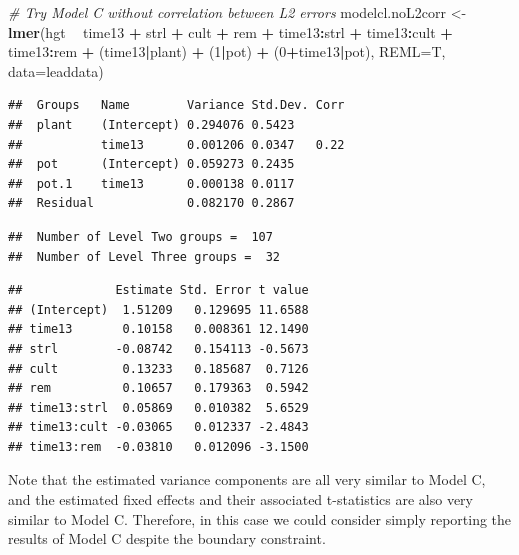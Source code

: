 \documentclass[
]{krantz}
\newenvironment{Shaded}{\begin{snugshade}}{\end{snugshade}}
\newcommand{\CommentTok}[1]{\textcolor[rgb]{0.37,0.37,0.37}{\textit{#1}}}
\newcommand{\DataTypeTok}[1]{\textcolor[rgb]{0.27,0.27,0.27}{#1}}
\newcommand{\DecValTok}[1]{\textcolor[rgb]{0.06,0.06,0.06}{#1}}
\newcommand{\KeywordTok}[1]{\textcolor[rgb]{0.27,0.27,0.27}{\textbf{#1}}}
\newcommand{\NormalTok}[1]{#1}
\newcommand{\OperatorTok}[1]{\textcolor[rgb]{0.43,0.43,0.43}{\textbf{#1}}}
\newcommand{\StringTok}[1]{\textcolor[rgb]{0.5,0.5,0.5}{#1}}
\begin{document}
\begin{Shaded}
\begin{Highlighting}[]
\CommentTok{# Try Model C without correlation between L2 errors}
\NormalTok{modelcl.noL2corr <-}\StringTok{ }\KeywordTok{lmer}\NormalTok{(hgt }\OperatorTok{~}\StringTok{ }\NormalTok{time13 }\OperatorTok{+}\StringTok{ }\NormalTok{strl }\OperatorTok{+}\StringTok{ }\NormalTok{cult }\OperatorTok{+}\StringTok{ }\NormalTok{rem }\OperatorTok{+}
\StringTok{    }\NormalTok{time13}\OperatorTok{:}\NormalTok{strl }\OperatorTok{+}\StringTok{ }\NormalTok{time13}\OperatorTok{:}\NormalTok{cult }\OperatorTok{+}\StringTok{ }\NormalTok{time13}\OperatorTok{:}\NormalTok{rem }\OperatorTok{+}\StringTok{ }\NormalTok{(time13}\OperatorTok{|}\NormalTok{plant) }\OperatorTok{+}
\StringTok{    }\NormalTok{(}\DecValTok{1}\OperatorTok{|}\NormalTok{pot) }\OperatorTok{+}\StringTok{ }\NormalTok{(}\DecValTok{0}\OperatorTok{+}\NormalTok{time13}\OperatorTok{|}\NormalTok{pot), }\DataTypeTok{REML=}\NormalTok{T, }\DataTypeTok{data=}\NormalTok{leaddata)}
\end{Highlighting}
\end{Shaded}

\begin{verbatim}
##  Groups   Name        Variance Std.Dev. Corr
##  plant    (Intercept) 0.294076 0.5423       
##           time13      0.001206 0.0347   0.22
##  pot      (Intercept) 0.059273 0.2435       
##  pot.1    time13      0.000138 0.0117       
##  Residual             0.082170 0.2867
\end{verbatim}

\begin{verbatim}
##  Number of Level Two groups =  107 
##  Number of Level Three groups =  32
\end{verbatim}

\begin{verbatim}
##             Estimate Std. Error t value
## (Intercept)  1.51209   0.129695 11.6588
## time13       0.10158   0.008361 12.1490
## strl        -0.08742   0.154113 -0.5673
## cult         0.13233   0.185687  0.7126
## rem          0.10657   0.179363  0.5942
## time13:strl  0.05869   0.010382  5.6529
## time13:cult -0.03065   0.012337 -2.4843
## time13:rem  -0.03810   0.012096 -3.1500
\end{verbatim}

Note that the estimated variance components are all very similar to Model C, and the estimated fixed effects and their associated t-statistics are also very similar to Model C. Therefore, in this case we could consider simply reporting the results of Model C despite the boundary constraint.
\end{document}
